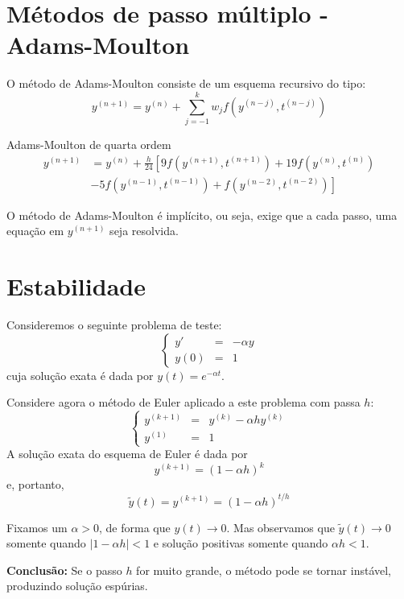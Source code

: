 \section{Métodos de passo múltiplo - Adams-Moulton}

O método de Adams-Moulton consiste de um esquema recursivo do tipo:
$$y^{(n+1)}=y^{(n)}+\sum_{j=-1}^k w_jf(y^{(n-j)},t^{(n-j)})$$

\begin{ex} Adams-Moulton de quarta ordem
  \begin{equation*}
    \begin{split}
      y^{(n+1)} &= y^{(n)} + \frac{h}{24}\left[9f\left(y^{(n+1)},t^{(n+1)}\right) + 19f\left(y^{(n)},t^{(n)}\right) \right.\\
      &-\left. 5f\left(y^{(n-1)},t^{(n-1)}\right) + f\left(y^{(n-2)},t^{(n-2)}\right)\right]      
    \end{split}
  \end{equation*}
\end{ex}
O método de Adams-Moulton é implícito, ou seja, exige que a cada passo, uma equação em $y^{(n+1)}$ seja resolvida.

\section{Estabilidade}

Consideremos o seguinte problema de teste:
$$\left\{\begin{array}{rcl}y'&=&-\alpha y\\y(0)&=&1\end{array}\right.$$
cuja solução exata é dada por $y(t)=e^{-\alpha t}$.

Considere agora o método de Euler aplicado a este problema com passa $h$:
$$\left\{\begin{array}{rcl}y^{(k+1)}&=&y^{(k)}-\alpha h y^{(k)}\\y^{(1)}&=&1\end{array}\right.$$
A solução exata do esquema de Euler é dada por
$$y^{(k+1)}=(1-\alpha h)^{k}$$
e, portanto,
$$\tilde{y}(t)=y^{(k+1)}=(1-\alpha h)^{t/h}$$

Fixamos um $\alpha>0$, de forma que $y(t)\to 0$. Mas observamos que $\tilde{y}(t)\to 0$ somente quando $|1-\alpha h|<1$ e solução positivas somente quando $\alpha h<1$.

{\bf Conclusão:} Se o passo $h$ for muito grande, o método pode se tornar instável, produzindo solução espúrias.

